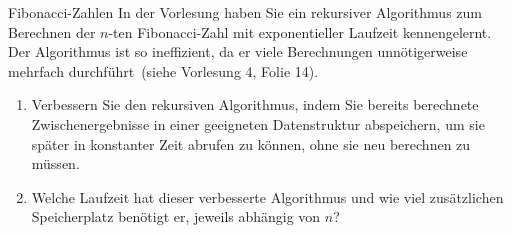 \documentclass[11pt,a4paper]{article}
\begin{document}
\begin{aufgabe}{3}{\hard Fibonacci-Zahlen}
In der Vorlesung haben Sie ein rekursiver Algorithmus zum Berechnen der $n$-ten Fibonacci-Zahl mit exponentieller Laufzeit kennengelernt.
Der Algorithmus ist so ineffizient, da er viele Berechnungen unnötigerweise mehrfach durchführt~(siehe Vorlesung 4, Folie 14).
\begin{enumerate}
    \item Verbessern Sie den rekursiven Algorithmus, indem Sie bereits berechnete Zwischenergebnisse in einer geeigneten Datenstruktur abspeichern, um sie später in konstanter Zeit abrufen zu können, ohne sie neu berechnen zu müssen.
    \item Welche Laufzeit hat dieser verbesserte Algorithmus und wie viel zusätzlichen Speicherplatz benötigt er, jeweils abhängig von $n$?
\end{enumerate}
\end{aufgabe}
\end{document}
